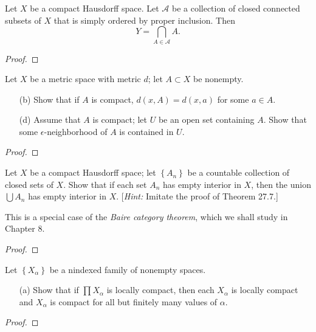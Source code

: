 \newpage
\begin{problem}[Munkres \S26, Ex.\,12]
\begin{theorem*}
Let $X$ be a compact Hausdorff space. Let $\mathcal{A}$ be a
collection of closed connected subsets of $X$ that is simply
ordered by proper inclusion. Then
\[Y=\bigcap_{A\in\mathcal{A}}A.\]
\end{theorem*}
\end{problem}
\begin{proof}
\end{proof}
\newpage
\begin{problem}[Munkres \S27, Ex.\,2(b,d)]
Let $X$ be a metric space with metric $d$; let $A\subset X$ be
nonempty.
\begin{itemize}
\item[(b)] Show that if $A$ is compact, $d(x,A)=d(x,a)$ for some
  $a\in A$.
\item[(d)] Assume that $A$ is compact; let $U$ be an open set
  containing $A$. Show that some $\epsilon$-neighborhood of $A$
  is contained in $U$.
\end{itemize}
\end{problem}
\begin{proof}
\end{proof}
\newpage
\begin{problem}[Munkres \S27, Ex.\,5]
Let $X$ be a compact Hausdorff space; let $\left\{A_n\right\}$ be
a countable collection of closed sets of $X$. Show that if each
set $A_n$ has empty interior in $X$, then the union $\bigcup A_n$
has empty interior in $X$. [\emph{Hint:} Imitate the proof of
Theorem 27.7.]

This is a special case of the \emph{Baire category theorem},
which we shall study in Chapter 8.
\end{problem}
\begin{proof}
\end{proof}
\newpage
\begin{problem}[Munkres \S28, Ex.\,2(a)]
Let $\left\{X_\alpha\right\}$ be a nindexed family of nonempty
spaces.
\begin{itemize}
\item[(a)] Show that if $\prod X_\alpha$ is locally compact, then
  each $X_\alpha$ is locally compact and $X_\alpha$ is compact
  for all but finitely many values of $\alpha$.
\end{itemize}
\end{problem}
\begin{proof}
\end{proof}
\newpage

